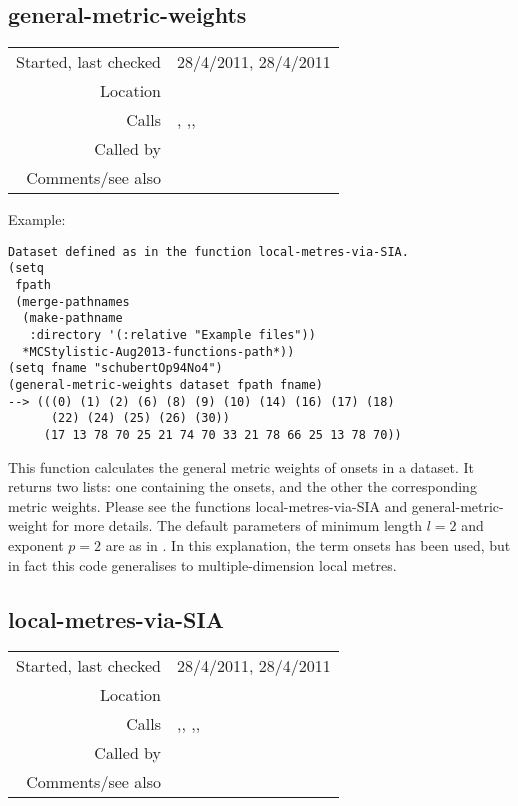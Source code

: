 \subsection*{general-metric-weights}\label{fun:general-metric-weights}

\vspace{0.3cm}
\begin{tabular}{r|p{8cm}}
Started, last checked & 28/4/2011, 28/4/2011 \\
Location & \nameref{sec:inner-metric-analysis} \\
Calls & \nameref{fun:general-metric-weight}, \nameref{fun:local-metres-via-SIA},\newline \nameref{fun:orthogonal-projection-unique-equalp},\newline \nameref{fun:read-from-file} \\
Called by & \\
Comments/see also & 
\end{tabular}

\vspace{0.5cm}
\noindent Example:
\begin{verbatim}
Dataset defined as in the function local-metres-via-SIA.
(setq
 fpath
 (merge-pathnames
  (make-pathname
   :directory '(:relative "Example files"))
  *MCStylistic-Aug2013-functions-path*))
(setq fname "schubertOp94No4")
(general-metric-weights dataset fpath fname)
--> (((0) (1) (2) (6) (8) (9) (10) (14) (16) (17) (18)
      (22) (24) (25) (26) (30))
     (17 13 78 70 25 21 74 70 33 21 78 66 25 13 78 70))
\end{verbatim}

\noindent This function calculates the general metric
weights \citep{volk2008} of onsets in a dataset. It
returns two lists: one containing the onsets, and the
other the corresponding metric weights. Please see the
functions local-metres-via-SIA and general-metric-weight
for more details. The default parameters of minimum
length $l = 2$ and exponent $p = 2$ are as in
\citet{volk2008}. In this explanation, the term onsets
has been used, but in fact this code generalises to
multiple-dimension local metres.


\subsection*{local-metres-via-SIA}\label{fun:local-metres-via-SIA}

\vspace{0.3cm}
\begin{tabular}{r|p{8cm}}
Started, last checked & 28/4/2011, 28/4/2011 \\
Location & \nameref{sec:inner-metric-analysis} \\
Calls & \nameref{fun:orthogonal-projection-unique-equalp},\newline \nameref{fun:read-from-file}, \nameref{fun:SIA-reflected-merge-sort},\newline \nameref{fun:vector-MTP-pairs2local-metres}, \nameref{fun:write-to-file} \\
Called by & \nameref{fun:general-metric-weights} \\
Comments/see also & 
\end{tabular}

